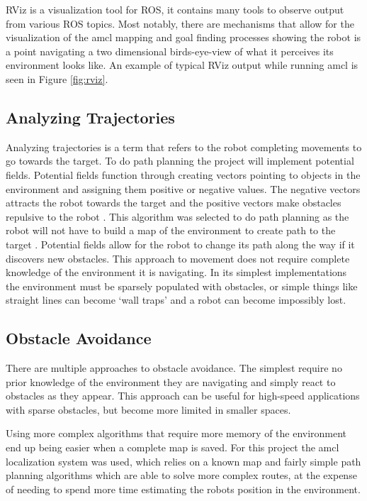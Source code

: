 \documentclass{article}[12]
\begin{document}
		RViz is a visualization tool for ROS, it contains many tools to observe output from various ROS topics. Most notably, there are mechanisms that allow for the visualization of the amcl mapping and goal finding processes showing the robot is a point navigating a two dimensional birds-eye-view of what it perceives its environment looks like. An example of typical RViz output while running amcl is seen in Figure \ref{fig:rviz}.
	
	\subsection{Analyzing Trajectories}
	
	Analyzing trajectories is a term that refers to the robot completing movements to go towards the target. To do path planning the project will implement potential fields. Potential fields function through creating vectors pointing to objects in the environment and assigning them positive or negative values. The negative vectors attracts the robot towards the target and the positive vectors make obstacles repulsive to the robot \cite{hwang1992potential}. This algorithm was selected to do path planning as the robot will not have to build a map of the environment to create path to the target \cite{bortoff2000path}. Potential fields allow for the robot to change its path along the way if it discovers new obstacles. This approach to movement does not require complete knowledge of the environment it is navigating. In its simplest implementations the environment must be sparsely populated with obstacles, or simple things like straight lines can become `wall traps' and a robot can become impossibly lost.

	\subsection{Obstacle Avoidance}
	
	There are multiple approaches to obstacle avoidance. The simplest require no prior knowledge of the environment they are navigating and simply react to obstacles as they appear. This approach can be useful for high-speed applications with sparse obstacles, \cite{barry2018high} but become more limited in smaller spaces.
	
	Using more complex algorithms that require more memory of the environment end up being easier when a complete map is saved. For this project the amcl localization system was used, which relies on a known map and fairly simple path planning algorithms which are able to solve more complex routes, at the expense of needing to spend more time estimating the robots position in the environment.\cite{doucet_freitas_gordon_2001}
\end{document}
